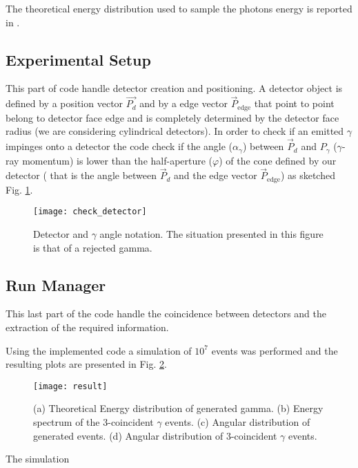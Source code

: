 The theoretical energy distribution used to sample the photons energy is reported in \cite{ore1949three}.

\subsection*{Experimental Setup}

This part of code handle detector creation and positioning. A detector object is defined by a position vector $\vec{P_d}$ and by a edge vector $\vec{P}_{\text{edge}}$ that point to point belong to detector face edge and is completely determined by the detector face radius (we are considering cylindrical detectors). In order to check if an emitted $\gamma$ impinges onto a detector the code check if the angle ($\alpha_\gamma$) between $\vec{P}_d$ and $P_\gamma$ ($\gamma$-ray momentum) is lower than the half-aperture ($\varphi$) of the cone defined by our detector ( that is the angle between $\vec{P}_d$ and the edge vector $\vec{P}_{\text{edge}}$) as sketched Fig. \ref{Fig: angle det check}.

\begin{figure}[H]
\centering
\texttt{[image: check\_detector]}
\caption{Detector and $\gamma$ angle notation. The situation presented in this figure is that of a rejected gamma.}
\label{Fig: angle det check}
\end{figure}


\subsection*{Run Manager}

This last part of the code handle the coincidence between detectors and the extraction of the required information.

Using the implemented code a simulation of $10^7$ events was performed and the resulting plots are presented in Fig. \ref{Fig: simulation result}.

\begin{figure}[H]
\centering
\texttt{[image: result]}
\caption{(a) Theoretical Energy distribution of generated gamma. (b) Energy spectrum of the 3-coincident $\gamma$ events. (c) Angular distribution of generated events. (d) Angular distribution of 3-coincident $\gamma$ events.}
\label{Fig: simulation result}
\end{figure}

The simulation 
